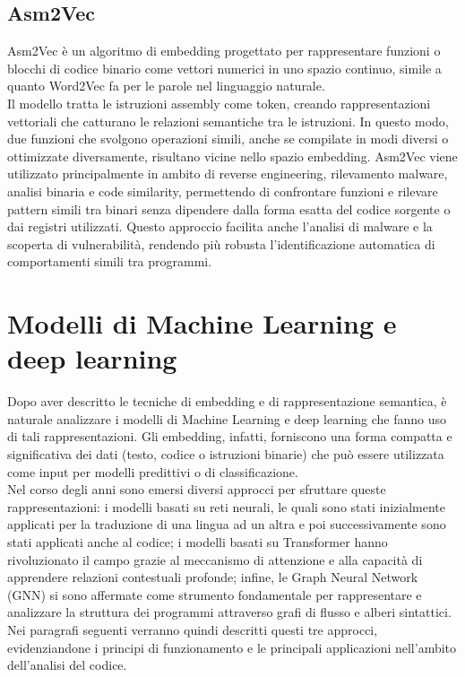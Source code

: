 \documentclass[12pt,a4paper,openright,twoside]{report}
\begin{document}
\subsection{Asm2Vec}

Asm2Vec \cite{Asm2Vec} è un algoritmo di embedding progettato per rappresentare funzioni o blocchi di codice binario come vettori numerici in uno spazio continuo, simile a quanto Word2Vec fa per le parole nel linguaggio naturale.\\
Il modello tratta le istruzioni assembly come token, creando rappresentazioni vettoriali che catturano le relazioni semantiche tra le istruzioni. In questo modo, due funzioni che svolgono operazioni simili, anche se compilate in modi diversi o ottimizzate diversamente, risultano vicine nello spazio embedding. Asm2Vec viene utilizzato principalmente in ambito di reverse engineering, rilevamento malware, analisi binaria e code similarity, permettendo di confrontare funzioni e rilevare pattern simili tra binari senza dipendere dalla forma esatta del codice sorgente o dai registri utilizzati. Questo approccio facilita anche l’analisi di malware e la scoperta di vulnerabilità, rendendo più robusta l’identificazione automatica di comportamenti simili tra programmi.
\newpage

\section{Modelli di Machine Learning e deep learning}

Dopo aver descritto le tecniche di embedding e di rappresentazione semantica, è naturale analizzare i modelli di Machine Learning e deep learning che fanno uso di tali rappresentazioni. 
Gli embedding, infatti, forniscono una forma compatta e significativa dei dati (testo, codice o istruzioni binarie) che può essere utilizzata come input per modelli predittivi o di classificazione.\\
Nel corso degli anni sono emersi diversi approcci per sfruttare queste rappresentazioni: 
i modelli basati su reti neurali, le quali sono stati inizialmente applicati per la traduzione di una lingua ad un altra e poi successivamente sono stati applicati anche al codice; 
i modelli basati su Transformer \cite{Transformer} hanno rivoluzionato il campo grazie al meccanismo di attenzione e alla capacità di apprendere relazioni contestuali profonde; 
infine, le Graph Neural Network (GNN) \cite{gnn} si sono affermate come strumento fondamentale per rappresentare e analizzare la struttura dei programmi attraverso grafi di flusso e alberi sintattici.\\
Nei paragrafi seguenti verranno quindi descritti questi tre approcci, evidenziandone i principi di funzionamento e le principali applicazioni nell’ambito dell’analisi del codice.
\end{document}
